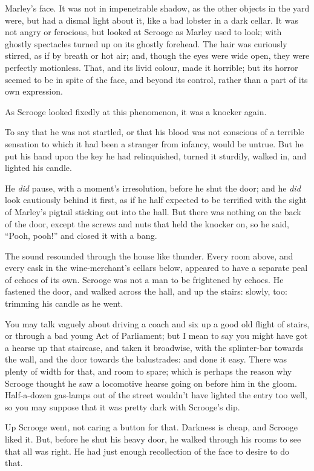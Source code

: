 \documentclass[paper=5.5in:8.5in,BCOR=7mm,twoside,DIV=calc,12pt,usegeometry]{scrbook} %
\begin{document}
Marley's face. It was not in impenetrable shadow, as the other objects in the yard were, but had a dismal light about it, like a bad lobster in a dark cellar. It was not angry or ferocious, but looked at Scrooge as Marley used to look; with ghostly spectacles turned up on its ghostly forehead. The hair was curiously stirred, as if by breath or hot air; and, though the eyes were wide open, they were perfectly motionless. That, and its livid colour, made it horrible; but its horror seemed to be in spite of the face, and beyond its control, rather than a part of its own expression.

As Scrooge looked fixedly at this phenomenon, it was a knocker again.

To say that he was not startled, or that his blood was not conscious of a terrible sensation to which it had been a stranger from infancy, would be untrue. But he put his hand upon the key he had relinquished, turned it sturdily, walked in, and lighted his can\-dle.

He \textit{did} pause, with a moment's irresolution, before he shut the door; and he \textit{did} look cautiously behind it first, as if he half expected to be terrified with the sight of Marley's pigtail sticking out into the hall. But there was nothing on the back of the door, except the screws and nuts that held the knocker on, so he said, \enquote{Pooh, pooh!} and closed it with a bang.

The sound resounded through the house like thunder. Every room above, and every cask in the wine-merchant's cellars below, appeared to have a separate peal of echoes of its own. Scrooge was not a man to be frightened by echoes. He fastened the door, and walked across the hall, and up the stairs: slowly, too: trimming his candle as he went.

You may talk vaguely about driving a coach and six up a good old flight of stairs, or through a bad young Act of Parliament; but I mean to say you might have got a hearse up that staircase, and taken it broadwise, with the splinter-bar towards the wall, and the door towards the balustrades: and done it easy. There was plenty of width for that, and room to spare; which is perhaps the reason why Scrooge thought he saw a locomotive hearse going on before him in the gloom. Half-a-dozen gas-lamps out of the street wouldn't have lighted the entry too well, so you may suppose that it was pretty dark with Scrooge's dip.

Up Scrooge went, not caring a button for that. Darkness is cheap, and Scrooge liked it. But, before he shut his heavy door, he walked through his rooms to see that all was right. He had just enough recollection of the face to desire to do that.
\end{document}
